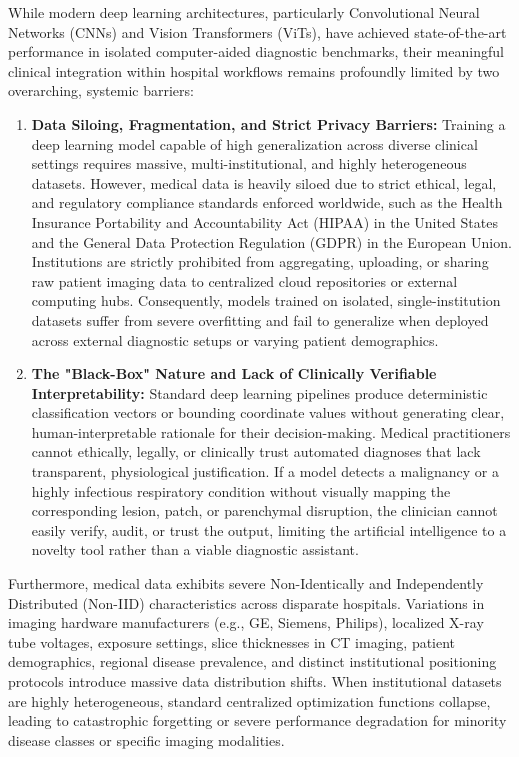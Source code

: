While modern deep learning architectures, particularly Convolutional Neural Networks (CNNs) and Vision Transformers (ViTs), have achieved state-of-the-art performance in isolated computer-aided diagnostic benchmarks, their meaningful clinical integration within hospital workflows remains profoundly limited by two overarching, systemic barriers:
\begin{enumerate}
	\item \textbf{Data Siloing, Fragmentation, and Strict Privacy Barriers:} Training a deep learning model capable of high generalization across diverse clinical settings requires massive, multi-institutional, and highly heterogeneous datasets. However, medical data is heavily siloed due to strict ethical, legal, and regulatory compliance standards enforced worldwide, such as the Health Insurance Portability and Accountability Act (HIPAA) in the United States and the General Data Protection Regulation (GDPR) in the European Union. Institutions are strictly prohibited from aggregating, uploading, or sharing raw patient imaging data to centralized cloud repositories or external computing hubs. Consequently, models trained on isolated, single-institution datasets suffer from severe overfitting and fail to generalize when deployed across external diagnostic setups or varying patient demographics.
	\item \textbf{The "Black-Box" Nature and Lack of Clinically Verifiable Interpretability:} Standard deep learning pipelines produce deterministic classification vectors or bounding coordinate values without generating clear, human-interpretable rationale for their decision-making. Medical practitioners cannot ethically, legally, or clinically trust automated diagnoses that lack transparent, physiological justification. If a model detects a malignancy or a highly infectious respiratory condition without visually mapping the corresponding lesion, patch, or parenchymal disruption, the clinician cannot easily verify, audit, or trust the output, limiting the artificial intelligence to a novelty tool rather than a viable diagnostic assistant.
\end{enumerate}

Furthermore, medical data exhibits severe Non-Identically and Independently Distributed (Non-IID) characteristics across disparate hospitals. Variations in imaging hardware manufacturers (e.g., GE, Siemens, Philips), localized X-ray tube voltages, exposure settings, slice thicknesses in CT imaging, patient demographics, regional disease prevalence, and distinct institutional positioning protocols introduce massive data distribution shifts. When institutional datasets are highly heterogeneous, standard centralized optimization functions collapse, leading to catastrophic forgetting or severe performance degradation for minority disease classes or specific imaging modalities.

